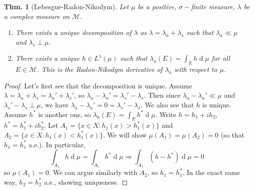 \documentclass[12pt, a4paper]{book}
\renewcommand{\d}[1]{\ensuremath{\operatorname{d}\!{#1}}} %
\newtheorem{theorem}{Thm.}[section]
\theoremstyle{nonumberplain}
\newtheorem{proof}{Proof}
\begin{document}
\begin{theorem}[Lebesgue-Radon-Nikodym]
    Let $\mu$ be a positive, $\sigma-$finite measure, $\lambda$ be a complex measure on $\mathcal{M}$.
    \begin{enumerate}[label=(\alph*)]
        \item There exists a unique decomposition of $\lambda$ as $\lambda=\lambda_a+\lambda_s$ such that $\lambda_a\ll\mu$ and $\lambda_s\perp\mu$.
        \item There exists a unique $h\in L^1(\mu)$ such that $\lambda_a(E)=\int_E h\d{\mu}$ for all $E\in\mathcal{M}$.
            This is the Radon-Nikodym derivative of $\lambda_a$ with respect to $\mu$.
    \end{enumerate}
\end{theorem}
\begin{proof}
    Let's first see that the decomposition is unique.
    Assume $\lambda=\lambda_a+\lambda_s=\lambda_a'+\lambda_s'$, so $\lambda_a-\lambda_a'=\lambda_s'-\lambda_s$.
    Then since  $\lambda_a-\lambda_a'\ll\mu$ and $\lambda_s'-\lambda_s\perp\mu$, we have $\lambda_a-\lambda_a'=0=\lambda_s'-\lambda_s$.
    We also see that $h$ is unique.
    Assume $h^*$ is another one, so $\lambda_a(E)=\int_E h^*\d{\mu}$.
    Write $h=h_1+ih_2$, $h^*=h_1^*+ih_2^*$.
    Let $A_1=\{x\in X:h_1(x)>h_1^*(x)\}$ and $A_2=\{x\in X:h_1(x)<h_1^*(x)\}$.
    We will show $\mu(A_1)=\mu(A_2)=0$ (so that $h_1=h_1^*$ a.e.).
    In particular,
    \[\int_{A_1}h\d{\mu}=\int_{A_1}h^*\d{\mu}\Rightarrow\int_{A_1}(h-h^*)\d{\mu}=0\]
    so $\mu(A_1)=0$.
    We can argue similarly with $A_2$, so $h_1=h_1^*$.
    In the exact same way, $h_2=h_2^*$ a.e., showing uniqueness.


\end{proof}
\end{document}
